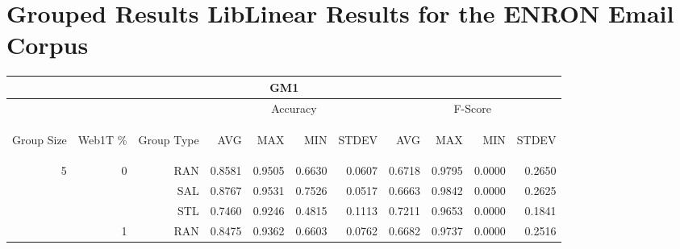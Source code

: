 \chapter{Grouped Results LibLinear Results for the ENRON Email Corpus}

\begin{center}
\begin{table}[htbp]
\begin{tabular}{ | r | r | r | r | r | r | r | r | r | r | r |}
\hline
\multicolumn{11}{|c|}{GM1}\\
\hline
 & & & \multicolumn{4}{|c|}{Accuracy} & \multicolumn{4}{|c|}{F-Score}\\ \cline{4-11}
\begin{sideways}Group Size\end{sideways} & \begin{sideways}Web1T \%\end{sideways} & \begin{sideways}Group Type\end{sideways} & \begin{sideways}AVG\end{sideways} & \begin{sideways}MAX\end{sideways} & \begin{sideways}MIN\end{sideways} & \begin{sideways}STDEV\end{sideways} & \begin{sideways}AVG\end{sideways} & \begin{sideways}MAX\end{sideways} & \begin{sideways}MIN\end{sideways} & \begin{sideways}STDEV\end{sideways}\\
\hline
\multirow{18}{*}{5}
 & \multirow{3}{*}{0} & RAN & 0.8581 & 0.9505 & 0.6630 & 0.0607 & 0.6718 & 0.9795 & 0.0000 & 0.2650\\ \cline{3-11}
 &   & SAL & 0.8767 & 0.9531 & 0.7526 & 0.0517 & 0.6663 & 0.9842 & 0.0000 & 0.2625\\ \cline{3-11}
 &   & STL & 0.7460 & 0.9246 & 0.4815 & 0.1113 & 0.7211 & 0.9653 & 0.0000 & 0.1841\\ \cline{2-11}
 & \multirow{3}{*}{1} & RAN & 0.8475 & 0.9362 & 0.6603 & 0.0762 & 0.6682 & 0.9737 & 0.0000 & 0.2516\\ \cline{3-11}

\end{tabular}
\end{table}
\end{center}
